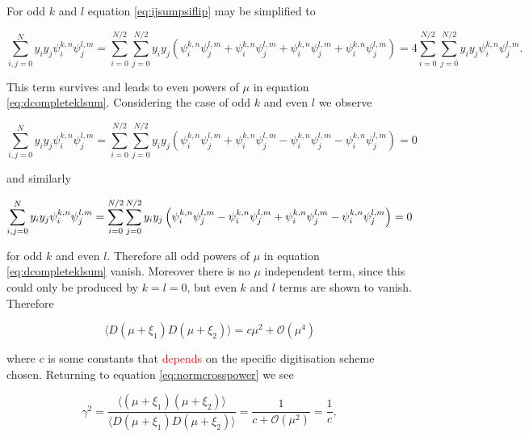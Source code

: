 \documentclass[apj]{emulateapj}
\newcommand{\changed}[1]{\textcolor{Red}{#1}}
\begin{document}
For odd $k$ and $l$ equation \ref{eq:ijsumpsiflip} may be simplified to

\begin{equation}
\sum_{i,j = 0}^N y_i y_j \psi_i^{k, n} \psi_j^{l, m} = \sum_{i = 0}^{N/2}\sum_{j = 0}^{N/2} y_i y_j \left( \psi_i^{k, n} \psi_j^{l, m} + \psi_{i}^{k, n} \psi_j^{l, m} + \psi_i^{k, n} \psi_{j}^{l, m} + \psi_{i}^{k, n} \psi_{j}^{l, m} \right) = 4 \sum_{i = 0}^{N/2}\sum_{j = 0}^{N/2} y_i y_j \psi_i^{k, n} \psi_j^{l, m}.
\end{equation}

This term survives and leads to even powers of $\mu$ in equation \ref{eq:dcompleteklsum}. Considering the case of odd $k$ and even $l$ we observe

\begin{equation}
\sum_{i,j = 0}^N y_i y_j \psi_i^{k, n} \psi_j^{l, m} = \sum_{i = 0}^{N/2}\sum_{j = 0}^{N/2} y_i y_j \left( \psi_i^{k, n} \psi_j^{l, m} + \psi_{i}^{k, n} \psi_j^{l, m} - \psi_i^{k, n} \psi_{j}^{l, m} - \psi_{i}^{k, n} \psi_{j}^{l, m} \right) = 0
\end{equation}

and similarly

\begin{equation}
\sum_{i,j = 0}^N y_i y_j \psi_i^{k, n} \psi_j^{l, m} = \sum_{i = 0}^{N/2}\sum_{j = 0}^{N/2} y_i y_j \left( \psi_i^{k, n} \psi_j^{l, m} - \psi_{i}^{k, n} \psi_j^{l, m} + \psi_i^{k, n} \psi_{j}^{l, m} - \psi_{i}^{k, n} \psi_{j}^{l, m} \right) = 0\\
\end{equation}

for odd $k$ and even $l$. Therefore all odd powers of $\mu$ in equation \ref{eq:dcompleteklsum} vanish. Moreover there is no $\mu$ independent term, since this could only be produced by $k=l=0$, but even $k$ and $l$ terms are shown to vanish. Therefore

\begin{equation}
\langle D(\mu + \xi_1) D(\mu + \xi_2) \rangle = c \mu^2 + \mathcal{O}(\mu^4)
\end{equation}

where $c$ is some constants that \changed{depends} on the specific digitisation scheme chosen. Returning to equation \ref{eq:normcrosspower} we see

\begin{equation}
\gamma^2  = \frac{\langle (\mu + \xi_1) (\mu + \xi_2) \rangle}{\langle D(\mu + \xi_1) D(\mu + \xi_2) \rangle} = \frac{1}{c + \mathcal{O}(\mu^2)} = \frac{1}{c},
\end{equation}
\end{document}
